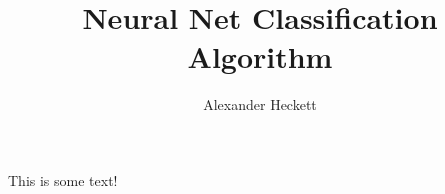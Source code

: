\documentclass{article}
\begin{document}
\title{Neural Net Classification Algorithm}
\author{Alexander Heckett}
\maketitle
This is some text!
\end{document}
